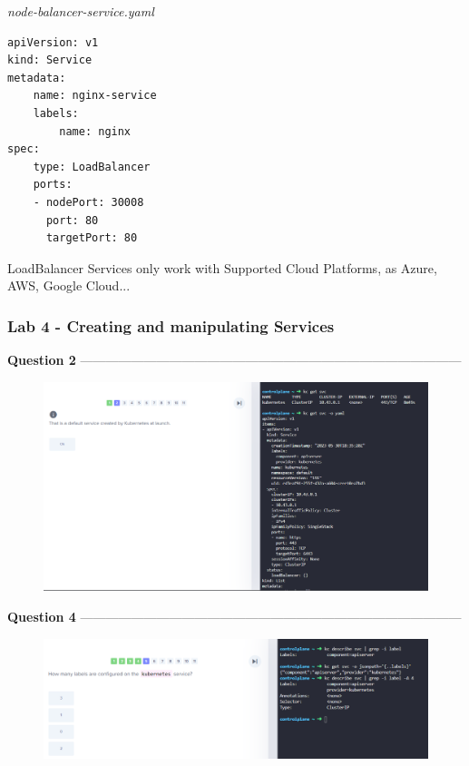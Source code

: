 \documentclass{article}
\newenvironment{blocktemplateIII}[1]{%
    \tcolorbox[beamer,%
    noparskip,breakable,
    ,colframe=Red,%
    colbacklower=LimeGreen!75!LightGreen,%
    title=#1]}%
    {\endtcolorbox}
\newenvironment{codetemplate}[1][]{%
  \mybasecolorbox[#1]
  \itshape
}{%
  \endmybasecolorbox
}
\begin{document}
\begin{codetemplate}{node-balancer-service.yaml}
\begin{verbatim}
apiVersion: v1
kind: Service
metadata:
    name: nginx-service
    labels:
        name: nginx
spec:
    type: LoadBalancer
    ports:
    - nodePort: 30008
      port: 80
      targetPort: 80
\end{verbatim}
\end{codetemplate}

\begin{blocktemplateIII}{WARNING}
LoadBalancer Services only work with Supported Cloud Platforms, as Azure, AWS, Google Cloud...    
\end{blocktemplateIII}

\newpage
\subsubsection{Lab 4 - Creating and manipulating Services}
\textbf{Question 2} ------------------------------------------------------------------------------------------
\begin{figure}[H]
    \centering
    \includegraphics[width=\textwidth]{pictures/q41.png}
\end{figure}
\textbf{Question 4} ------------------------------------------------------------------------------------------
\begin{figure}[H]
    \centering
    \includegraphics[width=\textwidth]{pictures/q42.png}
\end{figure}
\end{document}
